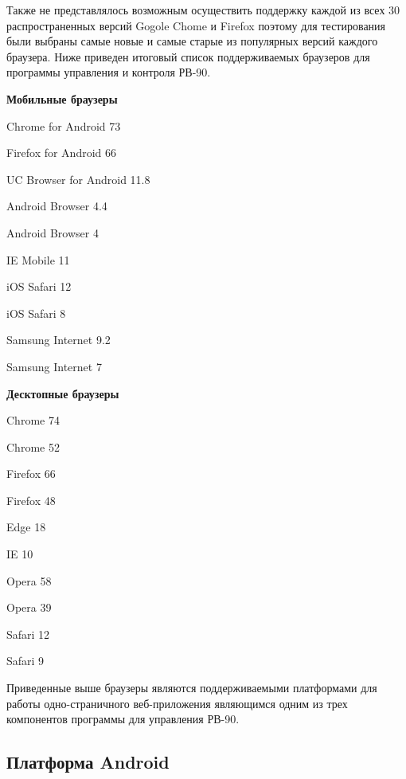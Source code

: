 Также не представлялось возможным осуществить поддержку каждой из всех 30 распространенных версий Gogole Chome и Firefox поэтому для тестирования были выбраны самые новые и самые старые из популярных версий каждого браузера.
Ниже приведен итоговый список поддерживаемых браузеров для программы управления и контроля РВ-90.

\textbf{Мобильные браузеры}
\begin{my_itemize}
\item Chrome for Android 73
\item Firefox for Android 66
\item UC Browser for Android 11.8
\item Android Browser 4.4
\item Android Browser 4
\item IE Mobile 11
\item iOS Safari 12
\item iOS Safari 8
\item Samsung Internet 9.2
\item Samsung Internet 7
\end{my_itemize}

\textbf{Десктопные браузеры}
\begin{my_itemize}
\item Chrome 74
\item Chrome 52
\item Firefox 66
\item Firefox 48
\item Edge 18
\item IE 10
\item Opera 58
\item Opera 39
\item Safari 12
\item Safari 9
\end{my_itemize}

Приведенные выше браузеры являются поддерживаемыми платформами для работы одно-страничного веб-приложения являющимся одним из трех компонентов программы для управления РВ-90.


\newpage
\subsection{Платформа Android}










